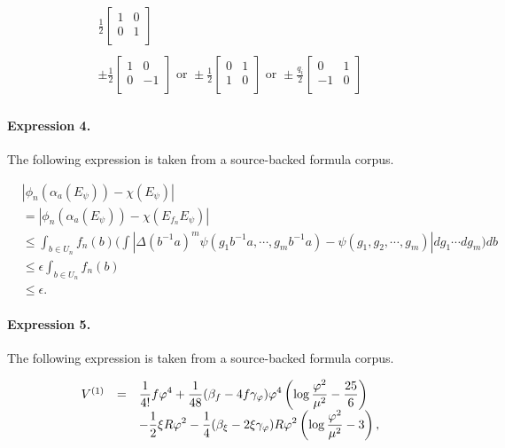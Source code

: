 \documentclass[11pt]{article}
\begin{document}
\begin{align*}\begin{array}{c}\frac{1}{2}\left[\begin{array}{cc}1 &0 \\ 0 &1 \\\end{array}\right] \\ \\ \pm\frac{1}{2}\left[\begin{array}{cc}1 &0 \\ 0 &-1\\ \end{array}\right] \text{ or } \pm\frac{1}{2}\left[\begin{array}{cc}0 &1 \\ 1 &0\\ \end{array}\right] \text{ or } \pm\frac{q_{i}}{2}\left[\begin{array}{cc}0 &1 \\ -1 &0\\ \end{array}\right]\end{array}\end{align*}

\paragraph{Expression 4.} The following expression is taken from a source-backed formula corpus.

\begin{align*}& |\phi_{n}(\alpha_{a}(E_{\psi}))-\chi(E_{\psi})| \\&= | \phi_{n}(\alpha_{a}(E_{\psi}))-\chi(E_{f_{n}}E_{\psi})|\\& \leq \int_{b \in U_{n}}f_{n}(b)\Big(\int |\Delta(b^{-1}a)^{m}\psi(g_{1}b^{-1}a,\cdots,g_{m}b^{-1}a)-\psi(g_{1},g_{2},\cdots,g_{m})| dg_{1} \cdots dg_{m} \Big)db \\ & \leq \epsilon \int _{b \in U_{n}}f_{n}(b) \\& \leq \epsilon.\end{align*}

\paragraph{Expression 5.} The following expression is taken from a source-backed formula corpus.

\begin{align*}\begin{array}{lll}V^{(1)}&=&\displaystyle{1 \over 4!} f\varphi^4+{1 \over 48} (\beta_f -4f \gamma_{\varphi}) \varphi^4\left( \log {\varphi^2 \over \mu^2 } - {25 \over 6} \right) \\&&\displaystyle-{1 \over 2}\xi R \varphi^2-{1 \over 4} (\beta_{\xi} -2\xi \gamma_{\varphi}) R \varphi^2\left( \log {\varphi^2 \over \mu^2 } -3 \right),\end{array}\end{align*}
\end{document}
